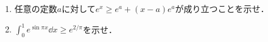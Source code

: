 \documentclass[../../main.tex]{subfiles}
\begin{document}
\begin{enumerate}
  \item 任意の定数$a$に対して$e^x\ge e^a+(x-a)e^a$が成り立つことを示せ．
  \item ${\displaystyle \int_0^1 e^{\sin \pi x} \dd x \ge e^{2/\pi} }$を示せ．
\end{enumerate}
\end{document}

